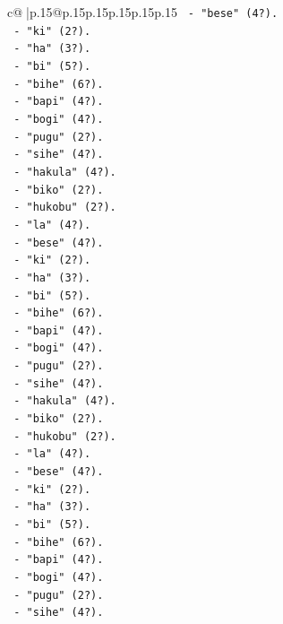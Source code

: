 \documentclass{article}
\begin{document}
{\begin{supertabular}{c@{$\;$}|p{.15\linewidth}@{}p{.15\linewidth}p{.15\linewidth}p{.15\linewidth}p{.15\linewidth}p{.15\linewidth}}
{{{\texttt{       {-} "bese" (4?).} \\
\texttt{       {-} "ki" (2?).} \\
\texttt{       {-} "ha" (3?).} \\
\texttt{       {-} "bi" (5?).} \\
\texttt{       {-} "bihe" (6?).} \\
\texttt{       {-} "bapi" (4?).} \\
\texttt{       {-} "bogi" (4?).} \\
\texttt{       {-} "pugu" (2?).} \\
\texttt{       {-} "sihe" (4?).} \\
\texttt{       {-} "hakula" (4?).} \\
\texttt{       {-} "biko" (2?).} \\
\texttt{       {-} "hukobu" (2?).} \\
\texttt{       {-} "la" (4?).} \\
\texttt{       {-} "bese" (4?).} \\
\texttt{       {-} "ki" (2?).} \\
\texttt{       {-} "ha" (3?).} \\
\texttt{       {-} "bi" (5?).} \\
\texttt{       {-} "bihe" (6?).} \\
\texttt{       {-} "bapi" (4?).} \\
\texttt{       {-} "bogi" (4?).} \\
\texttt{       {-} "pugu" (2?).} \\
\texttt{       {-} "sihe" (4?).} \\
\texttt{       {-} "hakula" (4?).} \\
\texttt{       {-} "biko" (2?).} \\
\texttt{       {-} "hukobu" (2?).} \\
\texttt{       {-} "la" (4?).} \\
\texttt{       {-} "bese" (4?).} \\
\texttt{       {-} "ki" (2?).} \\
\texttt{       {-} "ha" (3?).} \\
\texttt{       {-} "bi" (5?).} \\
\texttt{       {-} "bihe" (6?).} \\
\texttt{       {-} "bapi" (4?).} \\
\texttt{       {-} "bogi" (4?).} \\
\texttt{       {-} "pugu" (2?).} \\
\texttt{       {-} "sihe" (4?).} \\
}}}
\end{supertabular}}
\end{document}
